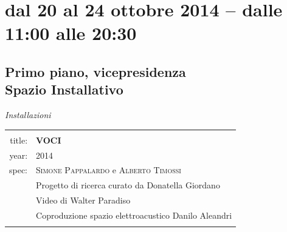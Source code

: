 \documentclass[9pt, twoside, a5paper]{extreport}
\begin{document}
\clearpage






%
%
%
%
%
%
%
	\clearpage





\section*{dal 20 al 24 ottobre 2014 -- dalle 11:00 alle 20:30}
\subsection*{\textsf{Primo piano, vicepresidenza\\
	{\small Spazio Installativo\\}}}

{\fontsize{30}{30}\selectfont \textit{Installazioni}}
\bigskip

\noindent
\begin{tabular}{r|p{10cm}}
								&			\\
\textsf{title:}					&			\textbf{VOCI}						\\
\textsf{year:}					&			2014								\\
\textsf{spec:}					&			\textsc{Simone Pappalardo} e \textsc{Alberto Timossi} 				\\
								&			Progetto di ricerca curato da Donatella Giordano \\
								&			Video di Walter Paradiso\\
								&			Coproduzione spazio elettroacustico Danilo Aleandri\\
								&			\\ %
\hline
\hline


\end{tabular}
\end{document}

